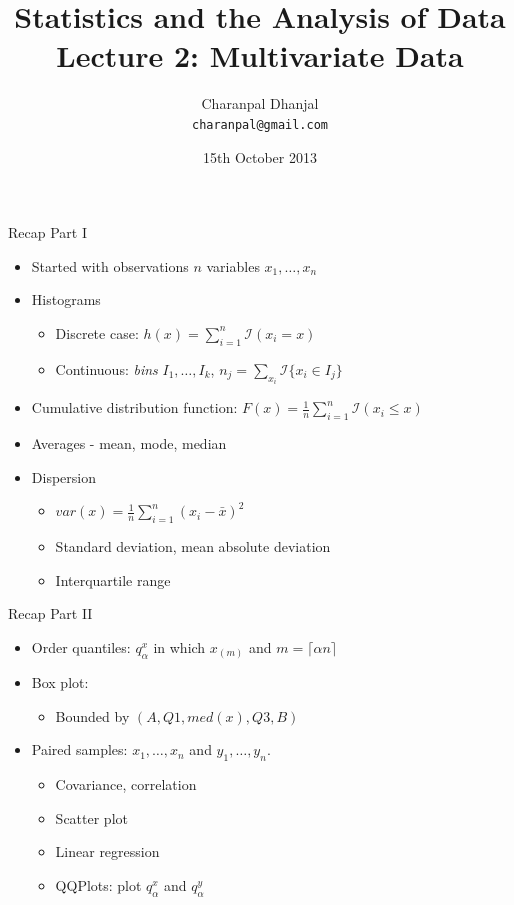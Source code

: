 \documentclass{beamer}
\title{Statistics and the Analysis of Data\\ Lecture 2: Multivariate Data}
\author{Charanpal Dhanjal \\ \texttt{charanpal@gmail.com}}
\institute{\'{E}cole des Ponts}
\date{15th October 2013}
\begin{document}
\frame{\titlepage}

\begin{frame}{Recap Part I}  
\begin{itemize} 
 \item Started with observations $n$ variables $x_1, \ldots, x_n$ 
 \item Histograms 
 \begin{itemize}
   \item Discrete case: $h(x) = \sum_{i=1}^n \mathcal{I}(x_i = x)$
 \item Continuous: \emph{bins} $ I_1, \ldots, I_k$, $n_j = \sum_{x_i} \mathcal{I}\{x_i \in I_j\}$
 \end{itemize} 
 \item Cumulative distribution function: $F(x) = \frac{1}{n}\sum_{i=1}^n \mathcal{I}(x_i \leq x)$
 \item Averages - mean, mode, median 
 \item Dispersion 
 \begin{itemize}
 \item $var(x) = \frac{1}{n}\sum_{i=1}^n (x_i - \bar{x})^2$
 \item Standard deviation, mean absolute deviation
 \item Interquartile range
 \end{itemize}
\end{itemize}
\end{frame}

\begin{frame}{Recap Part II}  
 \begin{itemize} 
  \item Order quantiles: $q_\alpha^x$ in which $x_{(m)}$ and $m = \lceil \alpha n \rceil$
  \item Box plot: 
  \begin{itemize} 
  \item Bounded by $(A, Q1, med(x), Q3, B)$ 
  \end{itemize}
  \item Paired samples: $x_1, \ldots, x_n$ and $y_1, \ldots, y_n$. 
   \begin{itemize}
   \item Covariance, correlation 
   \item Scatter plot 
   \item Linear regression 
   \item QQPlots: plot $q_\alpha^x$ and $q_\alpha^y$
   \end{itemize}
  \end{itemize}
\end{frame}
\end{document}
